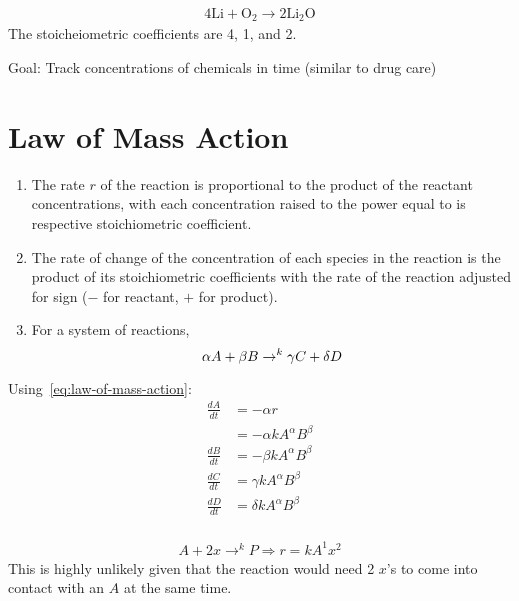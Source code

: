 \documentclass[
	date={October 14{,} 2024},
	month={10},
	day={14}
]{math486notes}
\begin{document}
\begin{equation*}
\begin{aligned}
	4\mbox{Li} + \mbox{O}_{2} \rightarrow 2\mbox{Li}_{2}\mbox{O}
\end{aligned}
\end{equation*}
The stoicheiometric coefficients are 4, 1, and 2.

Goal: Track concentrations of chemicals in time (similar to drug care)

\section{Law of Mass Action}\label{sec:law-of-mass-action}
\begin{enumerate}[label=\arabic*)]
	\item The rate $r$ of the reaction is proportional to the product of the reactant concentrations, with each concentration raised to the power equal to is respective stoichiometric coefficient.
	\item The rate of change of the concentration of each species in the reaction is the product of its stoichiometric coefficients with the rate of the reaction adjusted for sign ($-$ for reactant, $+$ for product).
	\item For a system of reactions,
	\begin{equation}
		\alpha A + \beta B \rightarrow^{k} \gamma C + \delta D\\
		\label{eq:law-of-mass-action}
	\end{equation}
\end{enumerate}
Using~\eqref{eq:law-of-mass-action}:
\begin{equation*}
\begin{aligned}
	\frac{dA}{dt} &= -\alpha r\\
				  &= -\alpha k A^{\alpha} B^{\beta}\\
	\frac{dB}{dt} &= -\beta k A^{\alpha} B^{\beta}\\
	\frac{dC}{dt} &= \gamma k A^{\alpha} B^{\beta}\\
	\frac{dD}{dt} &= \delta k A^{\alpha} B^{\beta}\\
\end{aligned}
\end{equation*}

\begin{equation*}
\begin{aligned}
	A + 2x \rightarrow^{k} P \Rightarrow r = kA^{1}x^{2}
\end{aligned}
\end{equation*}
This is highly unlikely given that the reaction would need 2 $x$'s to come into contact with an $A$ at the same time.
\end{document}
